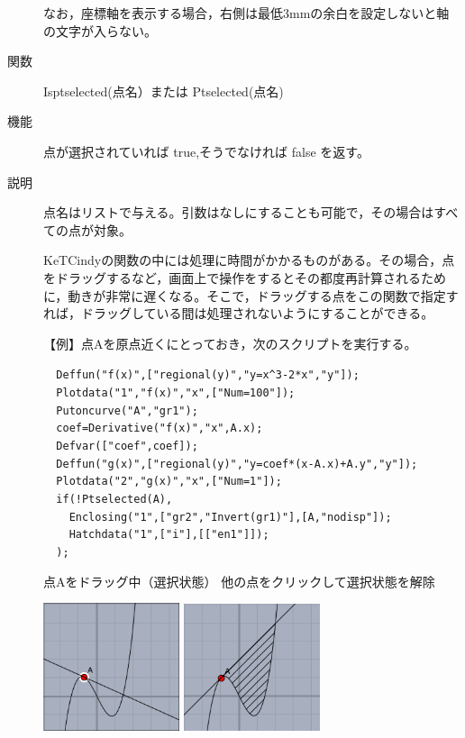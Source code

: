 \documentclass[papersize,a4paper,12pt,uplatex]{jsarticle}
\begin{document}
\begin{description}
なお，座標軸を表示する場合，右側は最低3mmの余白を設定しないと軸の文字が入らない。


\vspace{\baselineskip}
\hypertarget{isptselected}{}
\item[関数]  Isptselected(点名）または Ptselected(点名)
\item[機能]  点が選択されていれば true,そうでなければ false を返す。
\item[説明]  点名はリストで与える。引数はなしにすることも可能で，その場合はすべての点が対象。

KeTCindyの関数の中には処理に時間がかかるものがある。その場合，点をドラッグするなど，画面上で操作をするとその都度再計算されるために，動きが非常に遅くなる。そこで，ドラッグする点をこの関数で指定すれば，ドラッグしている間は処理されないようにすることができる。

\vspace{\baselineskip}
【例】点Aを原点近くにとっておき，次のスクリプトを実行する。

\verb|  Deffun("f(x)",["regional(y)","y=x^3-2*x","y"]);|\\
\verb|  Plotdata("1","f(x)","x",["Num=100"]);|\\
\verb|  Putoncurve("A","gr1");|\\
\verb|  coef=Derivative("f(x)","x",A.x);|\\
\verb|  Defvar(["coef",coef]);|\\
\verb|  Deffun("g(x)",["regional(y)","y=coef*(x-A.x)+A.y","y"]);|\\
\verb|  Plotdata("2","g(x)","x",["Num=1"]);|\\
\verb|  if(!Ptselected(A),|\\
\verb|    Enclosing("1",["gr2","Invert(gr1)"],[A,"nodisp"]);|\\
\verb|    Hatchdata("1",["i"],[["en1"]]);|\\
\verb|  );|

\vspace{\baselineskip}
\hspace{5mm} 点Aをドラッグ中（選択状態）\hspace{5mm} 他の点をクリックして選択状態を解除

\hspace{10mm}\includegraphics[bb=0.00 0.00 218.01 204.51,width=40mm]{Fig/ptselected01.pdf} 
\hspace{10mm}\includegraphics[bb=0.00 0.00 219.01 204.51,width=40mm]{Fig/ptselected02.pdf} 


\end{description}
\end{document}
